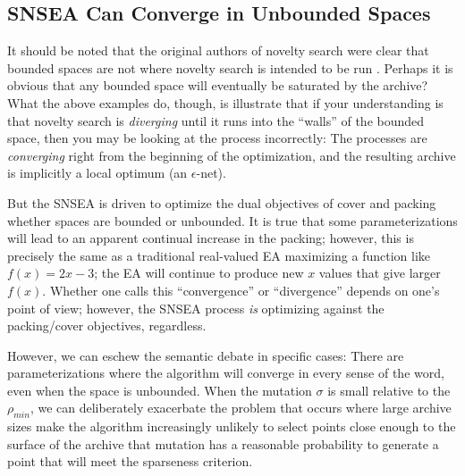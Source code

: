 \documentclass[twoside]{article}
\begin{document}


\subsection{SNSEA Can Converge in Unbounded Spaces}
\label{subsec:unbounded}

It should be noted that the original authors of novelty search were clear that bounded spaces are not where novelty search is intended to be run \cite{LehmanStanley2008ssls}.  Perhaps it is obvious that any bounded space will eventually be saturated by the archive?  What the above examples do, though, is illustrate that if your understanding is that novelty search is \emph{diverging} until it runs into the ``walls'' of the bounded space, then you may be looking at the process incorrectly:  The processes are \emph{converging} right from the beginning of the optimization, and the resulting archive is implicitly a local optimum (an $\epsilon$-net).

But the SNSEA is driven to optimize the dual objectives of cover and packing whether spaces are bounded or unbounded.  It is true that some parameterizations will lead to an apparent continual increase in the packing; however, this is precisely the same as a traditional real-valued EA maximizing a function like $f(x)=2x -3$; the EA will continue to produce new $x$ values that give larger $f(x)$.  Whether one calls this ``convergence'' or ``divergence'' depends on one's point of view; however, the SNSEA process \emph{is} optimizing against the packing/cover objectives, regardless.

However, we can eschew the semantic debate in specific cases:  There are parameterizations where the algorithm will converge in every sense of the word, even when the space is unbounded.  When the mutation $\sigma$ is small relative to the $\rho_{min}$, we can deliberately exacerbate the problem that occurs where large archive sizes make the algorithm increasingly unlikely to select points close enough to the surface of the archive that mutation has a reasonable probability to generate a point that will meet the sparseness criterion.
\end{document}
